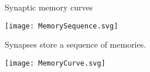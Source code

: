 \documentclass{beamer}%
\newcommand{\syn}{\vec{w}}
\newcommand{\synid}{\vec{s}}
\DeclareMathOperator{\snr}{SNR}
\newcommand{\snrb}{\overline{\snr}}
\renewcommand{\e}{\mathsf{e}}
\begin{document}
%
%
%
%
%
%
%

\begin{frame}{Synaptic memory curves}
%
 \begin{center}
   \texttt{[image: MemorySequence.svg]}
 \end{center}
 Synapses store a sequence of memories.
 \begin{center}
   {\texttt{[image: MemoryCurve.svg]}}
 \end{center}
%
\end{frame}
\end{document}
